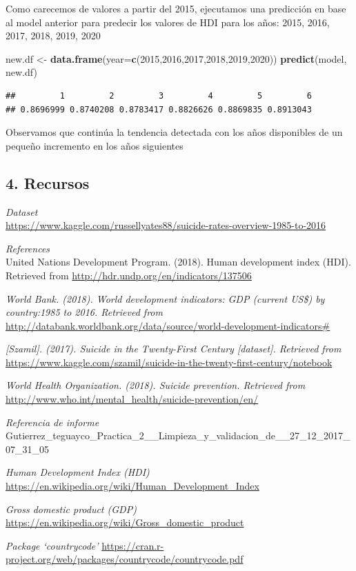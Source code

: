 \documentclass[]{article}
\newenvironment{Shaded}{\begin{snugshade}}{\end{snugshade}}
\newcommand{\DataTypeTok}[1]{\textcolor[rgb]{0.13,0.29,0.53}{#1}}
\newcommand{\DecValTok}[1]{\textcolor[rgb]{0.00,0.00,0.81}{#1}}
\newcommand{\KeywordTok}[1]{\textcolor[rgb]{0.13,0.29,0.53}{\textbf{#1}}}
\newcommand{\NormalTok}[1]{#1}
\newcommand{\StringTok}[1]{\textcolor[rgb]{0.31,0.60,0.02}{#1}}
\begin{document}
Como carecemos de valores a partir del 2015, ejecutamos una predicción
en base al model anterior para predecir los valores de HDI para los
años: 2015, 2016, 2017, 2018, 2019, 2020

\begin{Shaded}
\begin{Highlighting}[]
\NormalTok{new.df <-}\StringTok{ }\KeywordTok{data.frame}\NormalTok{(}\DataTypeTok{year=}\KeywordTok{c}\NormalTok{(}\DecValTok{2015}\NormalTok{,}\DecValTok{2016}\NormalTok{,}\DecValTok{2017}\NormalTok{,}\DecValTok{2018}\NormalTok{,}\DecValTok{2019}\NormalTok{,}\DecValTok{2020}\NormalTok{))}
\KeywordTok{predict}\NormalTok{(model, new.df)}
\end{Highlighting}
\end{Shaded}

\begin{verbatim}
##         1         2         3         4         5         6 
## 0.8696999 0.8740208 0.8783417 0.8826626 0.8869835 0.8913043
\end{verbatim}

Observamos que continúa la tendencia detectada con los años disponibles
de un pequeño incremento en los años siguientes

\hypertarget{recursos}{%
\subsection{4. Recursos}\label{recursos}}

\emph{Dataset}\\
\url{https://www.kaggle.com/russellyates88/suicide-rates-overview-1985-to-2016}

\emph{References}\\
United Nations Development Program. (2018). Human development index
(HDI). Retrieved from \url{http://hdr.undp.org/en/indicators/137506}

\emph{World Bank. (2018). World development indicators: GDP (current
US\$) by country:1985 to 2016. Retrieved from}
\url{http://databank.worldbank.org/data/source/world-development-indicators\#}

\emph{{[}Szamil{]}. (2017). Suicide in the Twenty-First Century
{[}dataset{]}. Retrieved from}
\url{https://www.kaggle.com/szamil/suicide-in-the-twenty-first-century/notebook}

\emph{World Health Organization. (2018). Suicide prevention. Retrieved
from}\\
\url{http://www.who.int/mental_health/suicide-prevention/en/}

\emph{Referencia de informe}\\
Gutierrez\_teguayco\_Practica\_2\_\_Limpieza\_y\_validacion\_de\_\_27\_12\_2017\_07\_31\_05

\emph{Human Development Index (HDI)}\\
\url{https://en.wikipedia.org/wiki/Human_Development_Index}

\emph{Gross domestic product (GDP)}\\
\url{https://en.wikipedia.org/wiki/Gross_domestic_product}

\emph{Package `countrycode'}
\url{https://cran.r-project.org/web/packages/countrycode/countrycode.pdf}
\end{document}

